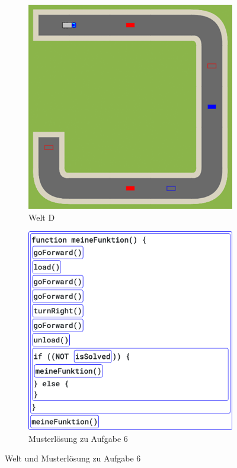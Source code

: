 \begin{figure}[H]
  \begin{subfigure}[b]{0.40\textwidth}
    \includegraphics[width=\textwidth]{gfx/exercises-world-d.png}
    \caption{Welt D}
  \end{subfigure}\hfill
  \begin{subfigure}[b]{0.40\textwidth}
    \includegraphics[width=\textwidth]{gfx/exercises-program-6.png}
    \caption{Musterlösung zu Aufgabe 6}
  \end{subfigure}\hfill
  \caption{Welt und Musterlösung zu Aufgabe 6}
\end{figure}

